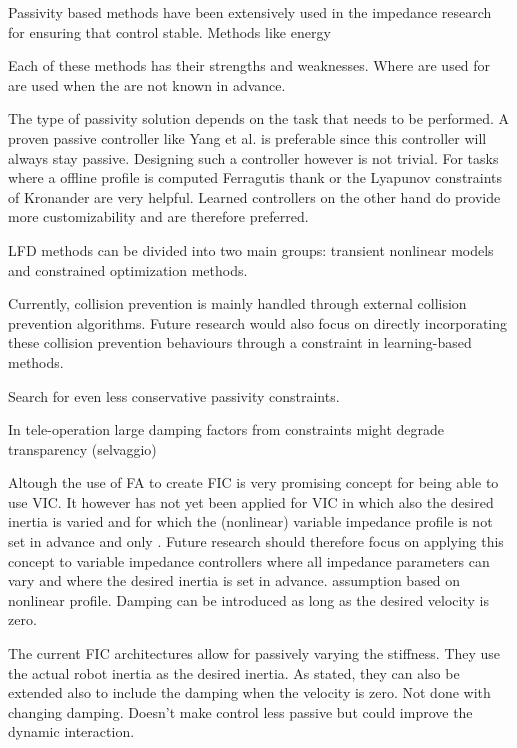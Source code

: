 Passivity based methods have been extensively used in the impedance research for ensuring that control stable. Methods like energy

Each of these methods has their strengths and weaknesses. Where are used for are used when the are not known in advance.


The type of passivity solution depends on the task that needs to be performed. A proven passive controller like \cite{yangHumanlikeAdaptationForce2011} Yang et al. is preferable since this controller will always stay passive. Designing such a controller however is not trivial. For tasks where a offline profile is computed \cite{ferragutiTankbasedApproachImpedance2013} Ferragutis thank or the Lyapunov constraints of \cite{kronanderStabilityConsiderationsVariable2016} Kronander are very helpful. Learned controllers on the other hand do provide more customizability and are therefore preferred.


LFD methods can be divided into two main groups: transient nonlinear models and constrained optimization methods.


Currently, collision prevention is mainly handled through external collision prevention algorithms. Future research would also focus on directly incorporating these collision prevention behaviours through a constraint in learning-based methods.


Search for even less conservative passivity constraints.


In tele-operation large damping factors from constraints might degrade transparency (selvaggio)


Altough the use of FA to create FIC is very promising concept for being able to use VIC. It however has not yet been applied for VIC in which also the desired inertia is varied and for which the (nonlinear) variable impedance profile is not set in advance and only . Future research should therefore focus on applying this concept to variable impedance controllers where all impedance parameters can vary and where the desired inertia is set in advance. assumption based on nonlinear profile.
Damping can be introduced as long as the desired velocity is zero.

The current FIC architectures allow for passively varying the stiffness. They use the actual robot inertia as the desired inertia. As stated, they can also be extended also to include the damping when the velocity is zero.
Not done with changing damping. Doesn't make control less passive but could improve the dynamic interaction.

